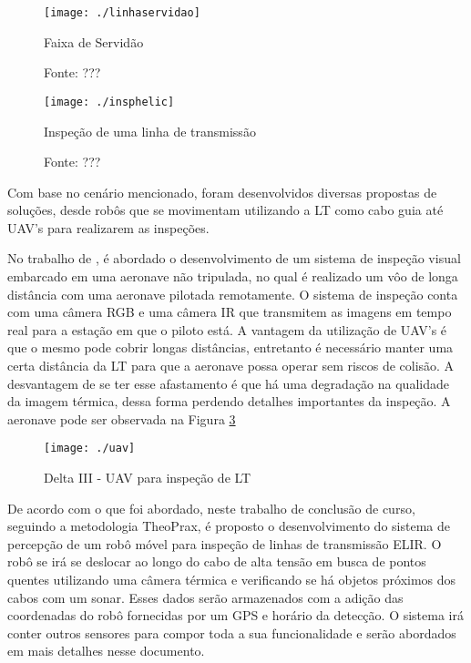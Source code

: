 \begin{figure}[!ht]
	\centering
	\texttt{[image: ./linhaservidao]}
	\caption{Faixa de Servidão} \label{linhaservidao}
	\caption*{Fonte: ???}
\end{figure}

\begin{figure}[!ht]
	\centering
	\texttt{[image: ./insphelic]}
	\caption{Inspeção de uma linha de transmissão} \label{lineinspection}
	\caption*{Fonte: ???}
\end{figure}

Com base no cenário mencionado, foram desenvolvidos diversas propostas de soluções, desde robôs que se movimentam utilizando a LT como cabo guia até UAV's para realizarem as inspeções.

No trabalho de , é abordado o desenvolvimento de um sistema de inspeção visual embarcado em uma aeronave não tripulada, no qual é realizado um vôo de longa distância com uma aeronave pilotada remotamente. O sistema de inspeção conta com uma câmera RGB e uma câmera IR que transmitem as imagens em tempo real para a estação em que o piloto está. A vantagem da utilização de UAV's é que o mesmo pode cobrir longas distâncias, entretanto é necessário manter uma certa distância da LT para que a aeronave possa operar sem riscos de colisão. A desvantagem de se ter esse afastamento é que há uma degradação na qualidade da imagem térmica, dessa forma perdendo detalhes importantes da inspeção. A aeronave pode ser observada na Figura \ref{uav}
\begin{figure}[!ht]
	\centering
	\texttt{[image: ./uav]}
	\caption{Delta III - UAV para inspeção de LT} \label{uav}
\end{figure}


De acordo com o que foi abordado, neste trabalho de conclusão de curso, seguindo a metodologia TheoPrax, é proposto o desenvolvimento do sistema de percepção de um robô móvel para inspeção de linhas de transmissão ELIR. O robô se irá se deslocar ao longo do cabo de alta tensão em busca de pontos quentes utilizando uma câmera térmica e verificando se há objetos próximos dos cabos com um sonar. Esses dados serão armazenados com a adição das coordenadas do robô fornecidas por um GPS e horário da detecção. O sistema irá conter outros sensores para compor toda a sua funcionalidade e serão abordados em mais detalhes nesse documento.

